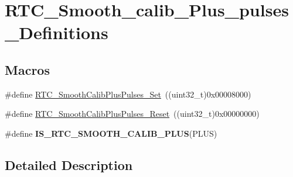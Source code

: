 \hypertarget{group___r_t_c___smooth__calib___plus__pulses___definitions}{\section{R\-T\-C\-\_\-\-Smooth\-\_\-calib\-\_\-\-Plus\-\_\-pulses\-\_\-\-Definitions}
\label{group___r_t_c___smooth__calib___plus__pulses___definitions}
}
\subsection*{Macros}
\begin{DoxyCompactItemize}
\item 
\#define \hyperlink{group___r_t_c___smooth__calib___plus__pulses___definitions_ga48a2b554e653139e8fda1d4ffd470144}{R\-T\-C\-\_\-\-Smooth\-Calib\-Plus\-Pulses\-\_\-\-Set}~((uint32\-\_\-t)0x00008000)
\item 
\#define \hyperlink{group___r_t_c___smooth__calib___plus__pulses___definitions_ga13d843306f6d3cd22e2443f45f191fe8}{R\-T\-C\-\_\-\-Smooth\-Calib\-Plus\-Pulses\-\_\-\-Reset}~((uint32\-\_\-t)0x00000000)
\item 
\#define {\bfseries I\-S\-\_\-\-R\-T\-C\-\_\-\-S\-M\-O\-O\-T\-H\-\_\-\-C\-A\-L\-I\-B\-\_\-\-P\-L\-U\-S}(P\-L\-U\-S)
\end{DoxyCompactItemize}


\subsection{Detailed Description}


